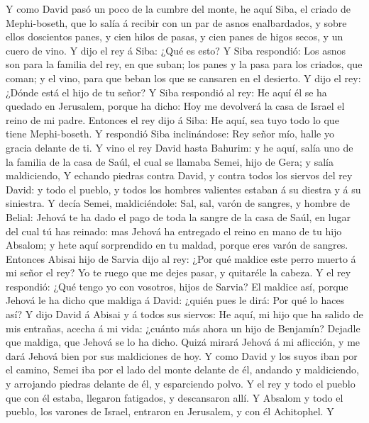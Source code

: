  Y como David pasó un poco de la cumbre del monte, he aquí
Siba, el criado de Mephi-boseth, que lo salía á recibir con un par de
asnos enalbardados, y sobre ellos doscientos panes, y cien hilos de
pasas, y cien panes de higos secos, y un cuero de vino.  Y
dijo el rey á Siba: ¿Qué es esto? Y Siba respondió: Los asnos son para
la familia del rey, en que suban; los panes y la pasa para los criados,
que coman; y el vino, para que beban los que se cansaren en el desierto.
 Y dijo el rey: ¿Dónde está el hijo de tu señor? Y Siba
respondió al rey: He aquí él se ha quedado en Jerusalem, porque ha
dicho: Hoy me devolverá la casa de Israel el reino de mi padre.
 Entonces el rey dijo á Siba: He aquí, sea tuyo todo lo que
tiene Mephi-boseth. Y respondió Siba inclinándose: Rey señor mío, halle
yo gracia delante de ti.  Y vino el rey David hasta Bahurim:
y he aquí, salía uno de la familia de la casa de Saúl, el cual se
llamaba Semei, hijo de Gera; y salía maldiciendo,  Y echando
piedras contra David, y contra todos los siervos del rey David: y todo
el pueblo, y todos los hombres valientes estaban á su diestra y á su
siniestra.  Y decía Semei, maldiciéndole: Sal, sal, varón de
sangres, y hombre de Belial:  Jehová te ha dado el pago de
toda la sangre de la casa de Saúl, en lugar del cual tú has reinado: mas
Jehová ha entregado el reino en mano de tu hijo Absalom; y hete aquí
sorprendido en tu maldad, porque eres varón de sangres. 
Entonces Abisai hijo de Sarvia dijo al rey: ¿Por qué maldice este perro
muerto á mi señor el rey? Yo te ruego que me dejes pasar, y quitaréle la
cabeza.  Y el rey respondió: ¿Qué tengo yo con vosotros,
hijos de Sarvia? El maldice así, porque Jehová le ha dicho que maldiga á
David: ¿quién pues le dirá: Por qué lo haces así?  Y dijo
David á Abisai y á todos sus siervos: He aquí, mi hijo que ha salido de
mis entrañas, acecha á mi vida: ¿cuánto más ahora un hijo de Benjamín?
Dejadle que maldiga, que Jehová se lo ha dicho.  Quizá
mirará Jehová á mi aflicción, y me dará Jehová bien por sus maldiciones
de hoy.  Y como David y los suyos iban por el camino, Semei
iba por el lado del monte delante de él, andando y maldiciendo, y
arrojando piedras delante de él, y esparciendo polvo.  Y el
rey y todo el pueblo que con él estaba, llegaron fatigados, y
descansaron allí.  Y Absalom y todo el pueblo, los varones
de Israel, entraron en Jerusalem, y con él Achitophel.  Y
